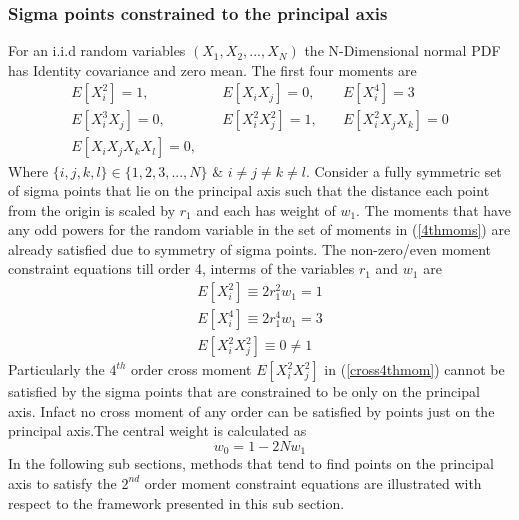 \documentclass[letterpaper, 10 pt, conference]{ieeeconf}  %
\begin{document}
\subsubsection{Sigma points constrained to the principal axis}
For an i.i.d random variables $(X_1,X_2,...,X_N)$ the N-Dimensional normal PDF has Identity covariance and zero mean. The first four moments are
\setlength{\arraycolsep}{0.0em}
\begin{eqnarray}
E[X_i^2]=1,& \quad E[X_iX_j]=0,& \quad E[X_i^4]=3 \nonumber\\
E[X_i^3X_j]=0,& \quad E[X_i^2X_j^2]=1,& \quad E[X_i^2X_jX_k]=0 \nonumber\\
E[X_iX_jX_kX_l]=0,&   & \label{4thmoms}
\end{eqnarray}
\setlength{\arraycolsep}{5pt}
Where $\{i,j,k,l\}\in\{1,2,3,...,N\}$ $\&$ $i \neq j \neq k \neq l$.
Consider a fully symmetric set of sigma points that lie on the principal axis such that the distance each point from the origin is scaled by $r_1$ and each has weight of $w_1$. The moments that have any odd powers for the random variable in the set of moments in (\ref{4thmoms}) are already satisfied due to symmetry of sigma points. The non-zero/even moment constraint equations till order 4, interms of the variables $r_1$ and $w_1$ are 
\setlength{\arraycolsep}{0.0em}
\begin{eqnarray}
E[X_i^2]\equiv2r_1^2w_1=1 \label{str2ndmom}\\
E[X_i^4]\equiv2r_1^4w_1=3 \label{str4thmom}\\
E[X_i^2X_j^2]\equiv0\neq1 \label{cross4thmom}
\end{eqnarray}
\setlength{\arraycolsep}{5pt}
Particularly the $4^{th}$ order cross moment $E[X_i^2X_j^2]$ in (\ref{cross4thmom}) cannot be satisfied by the sigma points that are constrained to be only on the principal axis. Infact no cross moment of any order can be satisfied by points just on the principal axis.The central weight is calculated as
\begin{equation}
w_0=1-2Nw_1 \label{centwt2ndequi}
\end{equation}
In the following sub sections, methods that tend to find points on the principal axis to satisfy the $2^{nd}$ order moment constraint equations are illustrated with respect to the framework presented in this sub section. 

\end{document}
